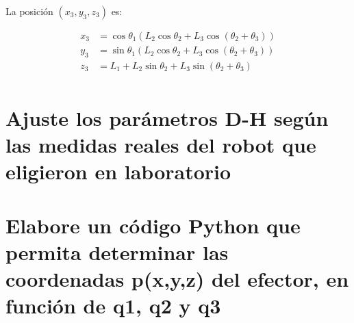 \documentclass[10pt]{article}
\theoremstyle{definition}
\theoremstyle{remark}
\theoremstyle{definition}
\numberwithin{equation}{prob}
\begin{document}
La posición \( (x_3, y_3, z_3) \) es:


\[
\begin{aligned}
x_3 &= \cos\theta_1 \left( L_2 \cos\theta_2 + L_3 \cos(\theta_2 + \theta_3) \right) \\
y_3 &= \sin\theta_1 \left( L_2 \cos\theta_2 + L_3 \cos(\theta_2 + \theta_3) \right) \\
z_3 &= L_1 + L_2 \sin\theta_2 + L_3 \sin(\theta_2 + \theta_3) \\
\end{aligned}
\]

\section{Ajuste los parámetros D-H según las medidas reales del robot que eligieron en laboratorio}

\section{Elabore un código Python que permita determinar las coordenadas p(x,y,z) del efector, en función de q1, q2 y q3}
\end{document}
